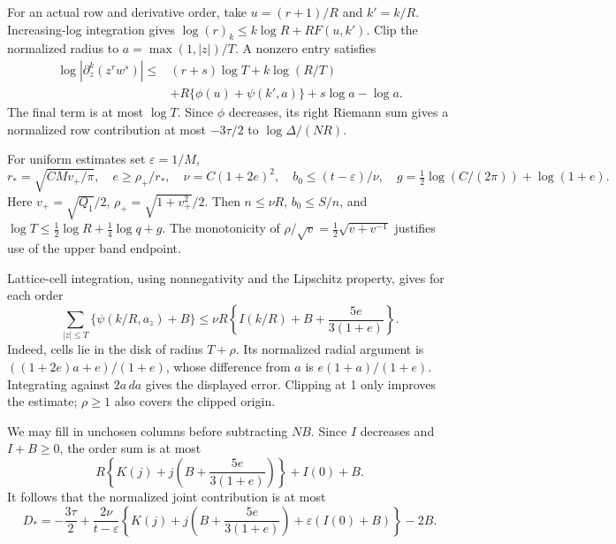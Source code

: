 \documentclass[11pt]{article}
\begin{document}
For an actual row and derivative order, take \(u=(r+1)/R\) and
\(k'=k/R\). Increasing-log integration gives
\(\log(r)_k\le k\log R+RF(u,k')\).
Clip the normalized radius to \(a=\max(1,|z|)/T\). A nonzero entry
satisfies
\begin{align*}
 \log|\partial_z^k(z^rw^s)|\le{}&
 (r+s)\log T+k\log(R/T)\\
 &+R\{\phi(u)+\psi(k',a)\}+s\log a-\log a.
\end{align*}
The final term is at most \(\log T\). Since \(\phi\) decreases, its
right Riemann sum gives a normalized row contribution at most
\(-3\tau/2\) to \(\log\Delta/(NR)\).

For uniform estimates set \(\varepsilon=1/M\),
\begin{equation}\label{geometry}
 r_* =\sqrt{CMv_+/\pi},\quad e\ge\rho_+/r_*,\quad
 \nu=C(1+2e)^2,\quad b_0\le(t-\varepsilon)/\nu,
 \quad g=\tfrac12\log(C/(2\pi))+\log(1+e).
\end{equation}
Here \(v_+=\sqrt{Q_1}/2\), \(\rho_+=\sqrt{1+v_+^2}/2\).
Then \(n\le\nu R\), \(b_0\le S/n\), and
\(\log T\le\frac12\log R+\frac14\log q+g\).
The monotonicity of \(\rho/\sqrt v=\frac12\sqrt{v+v^{-1}}\)
justifies use of the upper band endpoint.

Lattice-cell integration, using nonnegativity and the Lipschitz property,
gives for each order
\[
 \sum_{|z|\le T}\{\psi(k/R,a_z)+B\}
 \le\nu R\left\{I(k/R)+B+\frac{5e}{3(1+e)}\right\}.
\]
Indeed, cells lie in the disk of radius \(T+\rho\). Its normalized
radial argument is \(((1+2e)a+e)/(1+e)\), whose difference from
\(a\) is \(e(1+a)/(1+e)\). Integrating against \(2a\,da\) gives
the displayed error. Clipping at 1 only improves the estimate;
\(\rho\ge1\) also covers the clipped origin.

We may fill in unchosen columns before subtracting \(NB\).
Since \(I\) decreases and \(I+B\ge0\), the order sum is at most
\[
 R\left\{K(j)+j\left(B+\frac{5e}{3(1+e)}\right)\right\}+I(0)+B.
\]
It follows that the normalized joint contribution is at most
\begin{equation}\label{Djoint}
 D_*=-\frac{3\tau}2+
 \frac{2\nu}{t-\varepsilon}
 \left\{K(j)+j\left(B+\frac{5e}{3(1+e)}\right)
                  +\varepsilon(I(0)+B)\right\}-2B.
\end{equation}
\end{document}

